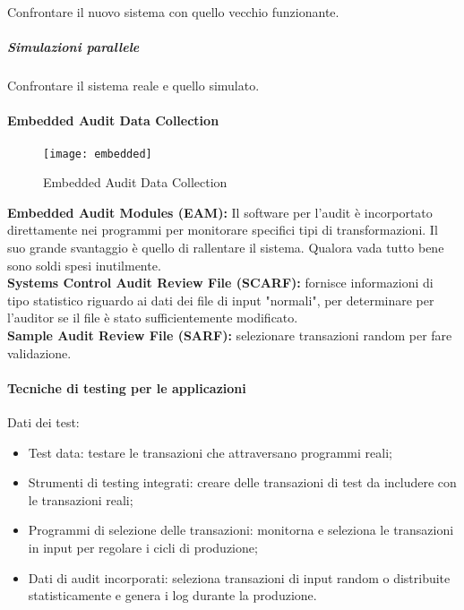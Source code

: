 Confrontare il nuovo sistema con quello vecchio funzionante.

\subparagraph*{Simulazioni parallele}

Confrontare il sistema reale e quello simulato.

\paragraph*{Embedded Audit Data Collection}

\begin{figure}[h!]
        \begin{center}
                \texttt{[image: embedded]}
        \end{center}
        \caption{Embedded Audit Data Collection}
        \label{fig:testing:facilities:parallel}
\end{figure}

\textbf{Embedded Audit Modules (EAM):} Il software per l'audit è incorportato direttamente 
nei programmi per monitorare specifici tipi di transformazioni. Il suo grande svantaggio è 
quello di rallentare il sistema. Qualora vada tutto bene sono soldi spesi inutilmente.\\
\newline
\textbf{Systems Control Audit Review File (SCARF):} fornisce informazioni di tipo statistico 
riguardo ai dati dei file di input "normali", per determinare per l'auditor se il file è 
stato sufficientemente modificato.\\
\newline
\textbf{Sample Audit Review File (SARF):} selezionare transazioni random per fare validazione.\\

\paragraph{Tecniche di testing per le applicazioni}

Dati dei test:
\begin{itemize}
    \item Test data: testare le transazioni che attraversano programmi reali;
    \item Strumenti di testing integrati: creare delle transazioni di test da includere con 
    le transazioni reali;
    \item Programmi di selezione delle transazioni: monitorna e seleziona le transazioni in input 
    per regolare i cicli di produzione;
    \item Dati di audit incorporati: seleziona transazioni di input random o distribuite statisticamente 
    e genera i log durante la produzione.
\end{itemize}

